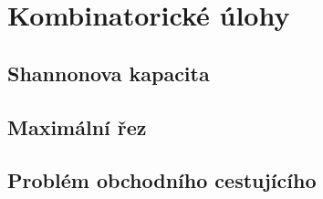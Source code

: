 \part{Kombinatorické úlohy}

\chapter{Shannonova kapacita}

\chapter{Maximální řez}


\chapter{Problém obchodního cestujícího}
